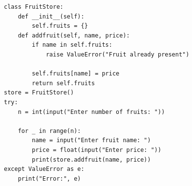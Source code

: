 \begin{verbatim}
class FruitStore:
    def __init__(self):
        self.fruits = {}
    def addfruit(self, name, price):
        if name in self.fruits:
            raise ValueError("Fruit already present")
        
        self.fruits[name] = price
        return self.fruits
store = FruitStore()
try:
    n = int(input("Enter number of fruits: "))

    for _ in range(n):
        name = input("Enter fruit name: ")
        price = float(input("Enter price: "))
        print(store.addfruit(name, price))
except ValueError as e:
    print("Error:", e)
\end{verbatim}